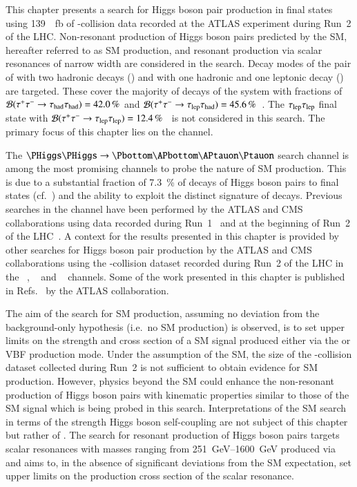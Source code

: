 This chapter presents a search for Higgs boson pair production in
\bbtautau final states using \SI{139}{\per\femto\barn} of
\pp-collision data recorded at the ATLAS experiment during Run~2 of
the LHC. Non-resonant production of Higgs boson pairs predicted by the
SM, hereafter referred to as SM \HH production, and resonant
production via scalar resonances of narrow width are considered in the
search. Decay modes of the pair of \tauleptons with two hadronic
\taulepton decays (\hadhad) and with one hadronic and one leptonic
\taulepton decay (\lephad) are targeted. These cover the majority of
decays of the \tautau system with fractions of
$\mathcal{B}(\tau^{+} \tau^{-} \to \tau_{\text{had}}\tau_{\text{had}}) = \SI{42.0}{\percent}$ and
$\mathcal{B}(\tau^{+} \tau^{-} \to \tau_{\text{lep}}\tau_{\text{had}}) =
\SI{45.6}{\percent}$~\cite{Zyla:2020zbs}. The $\tau_{\text{lep}}\tau_{\text{lep}}$ final
state with
$\mathcal{B}(\tau^{+} \tau^{-} \to \tau_{\text{lep}}\tau_{\text{lep}}) =
\SI{12.4}{\percent}$~\cite{Zyla:2020zbs} is not considered in this
search. The primary focus of this chapter lies on the \hadhad channel.

The $\HH \to \bbtautau$ search channel is among the most promising channels to
probe the nature of SM \HH production. This is due to a substantial fraction of
\SI{7.3}{\percent} of decays of Higgs boson pairs to \bbtautau final states
(cf.~) and the ability to exploit the distinct
signature of \taulepton decays. Previous searches in the \bbtautau channel have
been performed by the ATLAS and CMS collaborations using data recorded during
Run~1~\cite{HIGG-2013-33,CMS-HIG-15-013} and at the beginning of Run~2 of the
LHC~\cite{HIGG-2016-16-witherratum,CMS-HIG-17-002}. A context for the results
presented in this chapter is provided by other searches for Higgs boson pair
production by the ATLAS and CMS collaborations using the \pp-collision dataset
recorded during Run~2 of the LHC in the \bbtautau~\cite{CMS-PAS-HIG-20-010},
\bbbb~\cite{ATLAS-CONF-2022-035,CMS-HIG-20-005} and
\bbyy~\cite{HDBS-2018-34,CMS-HIG-19-018} channels. Some of the work presented in
this chapter is published in Refs.~\cite{ATLAS-CONF-2021-030,HDBS-2018-40} by
the ATLAS collaboration.

The aim of the search for SM \HH production, assuming no deviation
from the background-only hypothesis (i.e.\ no SM \HH production) is
observed, is to set upper limits on the strength and cross section of
a SM \HH signal produced either via the \ggF or VBF production
mode. Under the assumption of the SM, the size of the \pp-collision
dataset collected during Run~2 is not sufficient to obtain evidence
for SM \HH production. However, physics beyond the SM could enhance
the non-resonant production of Higgs boson pairs with kinematic
properties similar to those of the SM \HH signal which is being probed
in this search. Interpretations of the SM \HH search in terms of the
strength Higgs boson self-coupling are not subject of this chapter but
rather of . The search for resonant
production of Higgs boson pairs targets scalar resonances with masses
ranging from \SIrange{251}{1600}{\GeV} produced via \ggF and aims to,
in the absence of significant deviations from the SM expectation, set
upper limits on the production cross section of the scalar resonance.

